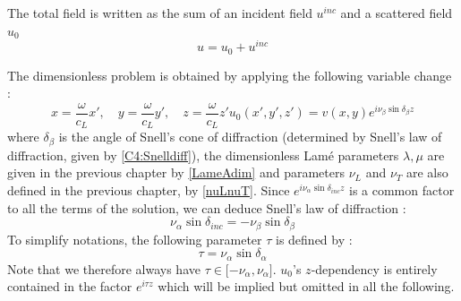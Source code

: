 The total field is written as the sum of an incident field $u^{inc}$ and a scattered field $u_0$
\begin{equation}
u=u_0+u^{inc}
\label{C4:scat}
\end{equation}

The dimensionless problem is obtained by applying the following variable change :
\begin{subequations}
\begin{equation}
x=\dfrac{\omega}{c_L}x', \hspace{1em} y=\dfrac{\omega}{c_L}y', \hspace{1em} z=\dfrac{\omega}{c_L}z'
\end{equation}
\begin{equation}
u_0(x',y',z')=v(x,y)e^{i\nu_{\beta}\sin\delta_{\beta}z}
\end{equation}
\label{C4:adiming}
\end{subequations}
where $\delta_{\beta}$ is the angle of Snell's cone of diffraction (determined by Snell's law of diffraction, given by \eqref{C4:Snelldiff}), the dimensionless Lamé parameters $\lambda,\mu$ are given in the previous chapter by \eqref{LameAdim} and parameters $\nu_L$ and $\nu_T$ are also defined in the previous chapter, by \eqref{nuLnuT}. Since $e^{i\nu_{\alpha}\sin\delta_{inc}z}$ is a common factor to all the terms of the solution, we can deduce Snell's law of diffraction :
\begin{equation}
\nu_{\alpha}\sin\delta_{inc}=-\nu_{\beta}\sin\delta_{\beta}
\label{C4:Snelldiff}
\end{equation}
To simplify notations, the following parameter $\tau$ is defined by :
\begin{equation}
\tau=\nu_{\alpha}\sin\delta_{\alpha}
\label{deftau}
\end{equation}
Note that we therefore always have $\tau \in \lbrack -\nu_{\alpha}, \nu_{\alpha} \rbrack$. $u_0$'s $z$-dependency is entirely contained in the factor $e^{i\tau z}$ which will be implied but omitted in all the following.

